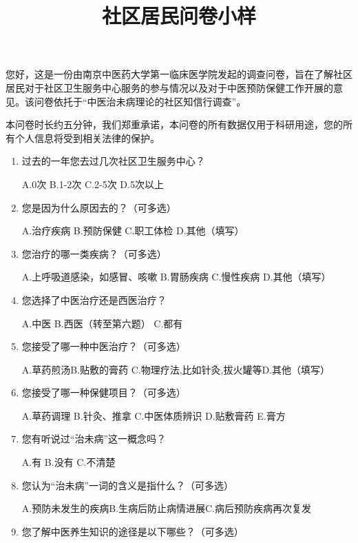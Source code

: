\documentclass{article}
\title{社区居民问卷小样}
\author{}
\date{}
\begin{document}
\maketitle
\clearpage
\begin{spacing}{1.0}
您好，这是一份由南京中医药大学第一临床医学院发起的调查问卷，旨在了解社区居民对于社区卫生服务中心服务的参与情况以及对于中医预防保健工作开展的意见。该问卷依托于“中医治未病理论的社区知信行调查”。

本问卷时长约五分钟，我们郑重承诺，本问卷的所有数据仅用于科研用途，您的所有个人信息将受到相关法律的保护。


\begin{enumerate}
\item 过去的一年您去过几次社区卫生服务中心？

A.0次 \qquad
B.1-2次\qquad
C.2-5次\qquad
D.5次以上

\item 您是因为什么原因去的？（可多选）

A.治疗疾病 \qquad
B.预防保健\qquad
C.职工体检\qquad
D.其他（填写）\underline{\makebox[6em]{}}

\item 您治疗的哪一类疾病？（可多选）

A.上呼吸道感染，如感冒、咳嗽\qquad
B.胃肠疾病\qquad
C.慢性疾病\qquad
D.其他（填写）\underline{\makebox[6em]{}}

\item 您选择了中医治疗还是西医治疗？

A.中医\qquad
B.西医（转至第六题）\qquad
C.都有

\item
您接受了哪一种中医治疗？（可多选）

A.草药煎汤\qquad B.贴敷的膏药\qquad 
C.物理疗法,比如针灸,拔火罐等\qquad D.其他（填写）\underline{\makebox[6em]{}}

\item 您接受了哪一种保健项目？（可多选）

A.草药调理\qquad
B.针灸、推拿\qquad
C.中医体质辨识\qquad
D.贴敷膏药\qquad
E.膏方

\item 您有听说过“治未病”这一概念吗？

A.有\qquad
B.没有\qquad
C.不清楚

\item 您认为“治未病”一词的含义是指什么？（可多选）

A.预防未发生的疾病\qquad B.生病后防止病情进展\qquad C.病后预防疾病再次复发

\item 您了解中医养生知识的途径是以下哪些？（可多选）


\end{enumerate}
\end{spacing}
\end{document}
